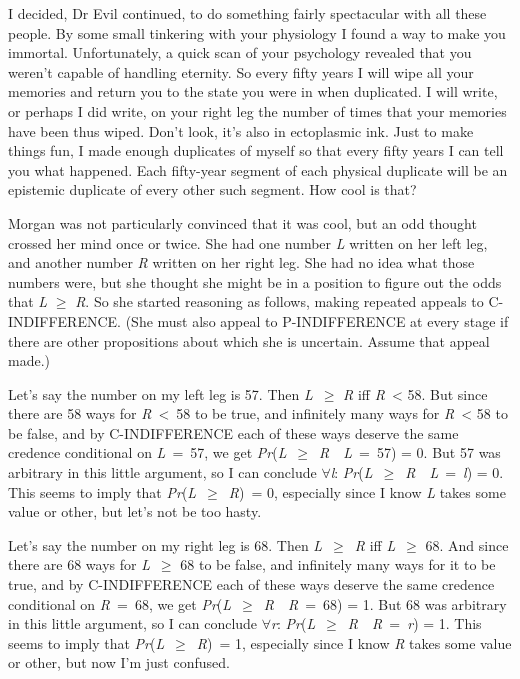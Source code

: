 \documentclass[
  11pt,
  letterpaper,
  DIV=11,
  numbers=noendperiod,
  oneside]{scrartcl}
\begin{document}
I decided, Dr Evil continued, to do something fairly spectacular with
all these people. By some small tinkering with your physiology I found a
way to make you immortal. Unfortunately, a quick scan of your psychology
revealed that you weren't capable of handling eternity. So every fifty
years I will wipe all your memories and return you to the state you were
in when duplicated. I will write, or perhaps I did write, on your right
leg the number of times that your memories have been thus wiped. Don't
look, it's also in ectoplasmic ink. Just to make things fun, I made
enough duplicates of myself so that every fifty years I can tell you
what happened. Each fifty-year segment of each physical duplicate will
be an epistemic duplicate of every other such segment. How cool is
that?

Morgan was not particularly convinced that it was cool, but an odd
thought crossed her mind once or twice. She had one number \emph{L}
written on her left leg, and another number \emph{R} written on her
right leg. She had no idea what those numbers were, but she thought she
might be in a position to figure out the odds that \emph{L} \({\geq}\)
\emph{R}. So she started reasoning as follows, making repeated appeals
to C-INDIFFERENCE. (She must also appeal to P-INDIFFERENCE at every
stage if there are other propositions about which she is uncertain.
Assume that appeal made.)

Let's say the number on my left leg is 57. Then \emph{L}~\({\geq}\)
\emph{R} iff \emph{R}~\textless{} 58. But since there are 58 ways for
\emph{R}~\textless~58 to be true, and infinitely many ways for
\emph{R}~\textless{} 58 to be false, and by C-INDIFFERENCE each of these
ways deserve the same credence conditional on \emph{L}~=~57, we get
\emph{Pr}(\emph{L}~\({\geq}\)~\emph{R}~~\emph{L}~=~57) = 0. But 57 was
arbitrary in this little argument, so I can conclude
\({\forall}\)\emph{l}:
\emph{Pr}(\emph{L}~\({\geq}\)~\emph{R}~~\emph{L}~=~\emph{l}) = 0. This
seems to imply that \emph{Pr}(\emph{L}~\({\geq}\)~\emph{R})~= 0,
especially since I know \emph{L} takes some value or other, but let's
not be too hasty.

Let's say the number on my right leg is 68. Then
\emph{L}~\({\geq}\)~\emph{R} iff \emph{L}~\({\geq}\) 68. And since there
are 68 ways for \emph{L}~\({\geq}\) 68 to be false, and infinitely many
ways for it to be true, and by C-INDIFFERENCE each of these ways deserve
the same credence conditional on \emph{R}~=~68, we get
\emph{Pr}(\emph{L}~\({\geq}\)~\emph{R}~~\emph{R}~=~68) = 1. But 68 was
arbitrary in this little argument, so I can conclude
\({\forall}\)\emph{r}:
\emph{Pr}(\emph{L}~\({\geq}\)~\emph{R}~~\emph{R}~=~\emph{r}) = 1. This
seems to imply that \emph{Pr}(\emph{L}~\({\geq}\)~\emph{R})~= 1,
especially since I know \emph{R} takes some value or other, but now I'm
just confused.
\end{document}
